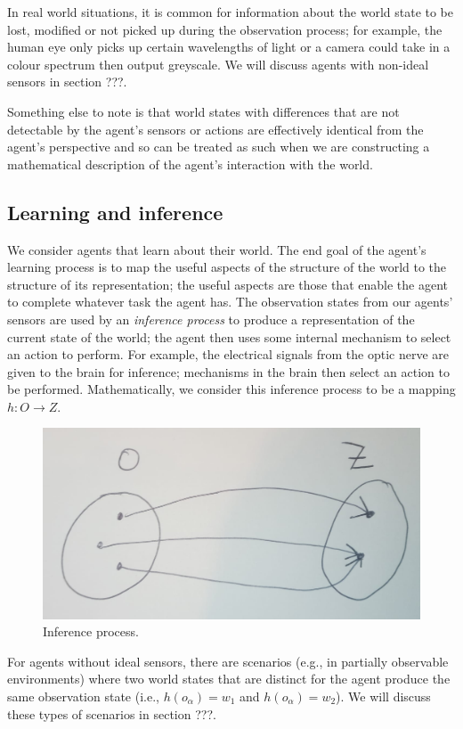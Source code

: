 In real world situations, it is common for information about the world state to be lost, modified or not picked up during the observation process; for example, the human eye only picks up certain wavelengths of light or a camera could take in a colour spectrum then output greyscale.
We will discuss agents with non-ideal sensors in section ???.

Something else to note is that world states with differences that are not detectable by the agent's sensors or actions are effectively identical from the agent's perspective and so can be treated as such when we are constructing a mathematical description of the agent's interaction with the world.

\subsection{Learning and inference}

We consider agents that learn about their world.
The end goal of the agent’s learning process is to map the useful aspects of the structure of the world to the structure of its representation; the useful aspects are those that enable the agent to complete whatever task the agent has.
The observation states from our agents' sensors are used by an \emph{inference process} to produce a representation of the current state of the world; the agent
then uses some internal mechanism to select an action to perform.
For example, the electrical signals from the optic nerve are given to the brain for inference; mechanisms in the brain then select an action to be performed.
Mathematically, we consider this inference process to be a mapping $h: O \to Z$.
\begin{figure}
	\centering
	\includegraphics[width=0.5\linewidth]{2MathematicalFramework/Images/inference_process_O_to_Z.jpeg}
	\caption{
		Inference process.
	}
	\label{fig:inference_process_O_to_Z}
\end{figure}

For agents without ideal sensors, there are scenarios (e.g., in partially observable environments) where two world states that are distinct for the agent produce the same observation state (i.e., $h(o_{\alpha}) = w_{1}$ and $h(o_{\alpha}) = w_{2}$).
We will discuss these types of scenarios in section ???.

